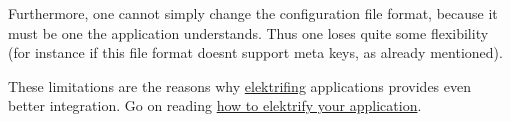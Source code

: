 Furthermore, one cannot simply change the configuration file format, because it must be one the application understands. Thus one loses quite some flexibility (for instance if this file format doesn\textquotesingle{}t support meta keys, as already mentioned).

These limitations are the reasons why \hyperlink{md_doc_help_elektra-glossary_doc_help_elektra-glossary_md}{elektrifing} applications provides even better integration. Go on reading \hyperlink{doc_tutorials_application-integration_md}{how to elektrify your application}. 